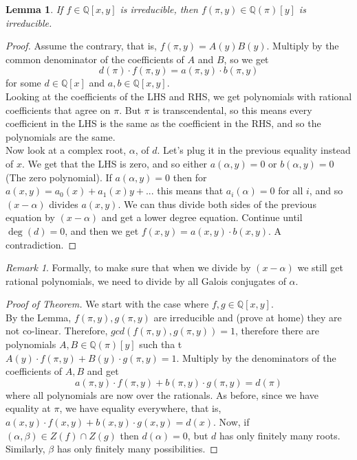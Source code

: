 \documentclass[12pt]{article}
\newtheorem{lemma}[theorem]{Lemma}
\theoremstyle{remark}
\newtheorem{remark}[theorem]{Remark}
\newcommand{\Q}{\mathbb{Q}}
\begin{document}
\begin{lemma}
If $f \in \Q[x,y]$ is irreducible, then $f(\pi,y) \in \Q(\pi)[y]$ is irreducible.

\end{lemma}
\begin{proof}
Assume the contrary, that is, $f(\pi,y) = A(y)B(y)$. Multiply by the common denominator of the coefficients of $A$ and $B$, so we get $$ d(\pi) \cdot f(\pi,y) = a(\pi,y) \cdot b(\pi,y)$$ for some $d \in \Q[x]$ and $a,b \in \Q[x,y]$. \\

Looking at the coefficients of the LHS and RHS, we get polynomials with rational coefficients that agree on $\pi$. But $\pi$ is transcendental, so this means every coefficient in the LHS is the same as the coefficient in the RHS, and so the polynomials are the same.\\


Now look at a complex root, $\alpha$, of $d$. Let's plug it in the previous equality instead of $x$. We get that the LHS is zero, and so either $a(\alpha,y) = 0$ or $b(\alpha,y)=0$ (The zero polynomial). If $a(\alpha,y) = 0$ then for $a(x,y) = a_0(x)+a_1(x)y + ...$ this means that $a_i(\alpha) = 0$ for all $i$, and so $(x-\alpha)$ divides $a(x,y)$. We can thus divide both sides of the previous equation by $(x-\alpha)$ and get a lower degree equation. Continue until $\deg(d) = 0$, and then we get $f(x,y) = a(x,y) \cdot b(x,y)$. A contradiction.
\end{proof}

\begin{remark}
Formally, to make sure that when we divide by $(x-\alpha)$ we still get rational polynomials, we need to divide by all Galois conjugates of $\alpha$.
\end{remark}

\begin{proof}[Proof of Theorem]
We start with the case where $f,g \in \Q[x,y]$. \\

By the Lemma, $f(\pi, y) , g(\pi,y)$ are irreducible and (prove at home) they are not co-linear.
 Therefore, $gcd(f(\pi,y), g(\pi,y))=1$, therefore there are polynomials
  $A,B \in \Q(\pi)[y]$ such tha
  t $A(y)\cdot f(\pi,y) + B(y) \cdot g(\pi,y) = 1$. Multiply by the denominators of the coefficients of $A,B$ and get
   $$a(\pi,y) \cdot f(\pi, y) + b(\pi,y)\cdot g(\pi,y) = d(\pi)$$ where all polynomials are now over the rationals.
    As before, since we have equality at $\pi$, we have equality everywhere, that is,
     $a(x,y) \cdot f(x,y) + b(x,y) \cdot g(x,y) = d(x)$. 
     Now, if $(\alpha, \beta) \in Z(f) \cap Z(g)$ then $d(\alpha) = 0$, but $d$ has only finitely many roots. Similarly, $\beta$ has only finitely many possibilities.

\end{proof}
\end{document}
